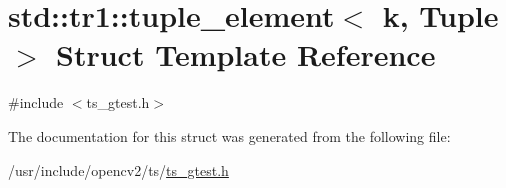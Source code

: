 \hypertarget{structstd_1_1tr1_1_1tuple__element}{\section{std\-:\-:tr1\-:\-:tuple\-\_\-element$<$ k, Tuple $>$ Struct Template Reference}
\label{structstd_1_1tr1_1_1tuple__element}
}


{\ttfamily \#include $<$ts\-\_\-gtest.\-h$>$}



The documentation for this struct was generated from the following file\-:\begin{DoxyCompactItemize}
\item 
/usr/include/opencv2/ts/\hyperlink{ts__gtest_8h}{ts\-\_\-gtest.\-h}\end{DoxyCompactItemize}
